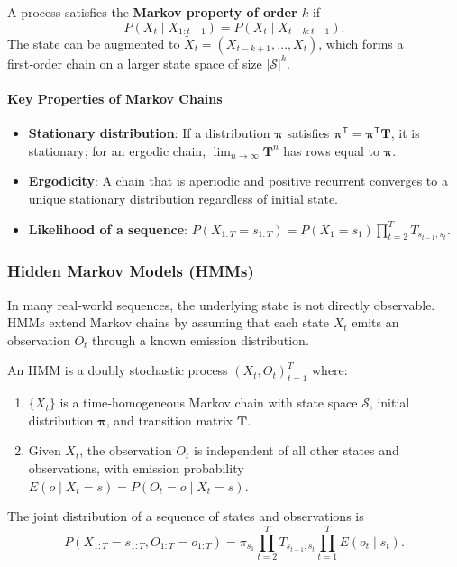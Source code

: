 \documentclass{tufte-handout}
\begin{document}
\begin{defn}
    A process satisfies the \textbf{Markov property of order $k$} if
    \[
    P(X_t \mid X_{1:t-1}) = P(X_t \mid X_{t-k:t-1}).
    \]
    The state can be augmented to $\tilde{X}_t = (X_{t-k+1}, \dots, X_t)$, which forms a first‑order chain on a larger state space of size $|\mathcal{S}|^k$.
\end{defn}

\paragraph{Key Properties of Markov Chains}

\begin{itemize}
    \item \textbf{Stationary distribution}: If a distribution $\boldsymbol{\pi}$ satisfies $\boldsymbol{\pi}^{\mathsf{T}} = \boldsymbol{\pi}^{\mathsf{T}} \mathbf{T}$, it is stationary; for an ergodic chain, $\lim_{n\to\infty} \mathbf{T}^n$ has rows equal to $\boldsymbol{\pi}$.
    \item \textbf{Ergodicity}: A chain that is aperiodic and positive recurrent converges to a unique stationary distribution regardless of initial state.
    \item \textbf{Likelihood of a sequence}: $P(X_{1:T}=s_{1:T}) = P(X_1=s_1) \prod_{t=2}^T T_{s_{t-1}, s_t}$.
\end{itemize}

\subsubsection{Hidden Markov Models (HMMs)}

In many real‑world sequences, the underlying state is not directly observable. HMMs extend Markov chains by assuming that each state $X_t$ emits an observation $O_t$ through a known emission distribution.

\begin{defn}
    An HMM is a doubly stochastic process $(X_t, O_t)_{t=1}^T$ where:
    \begin{enumerate}
        \item $\{X_t\}$ is a time‑homogeneous Markov chain with state space $\mathcal{S}$, initial distribution $\boldsymbol{\pi}$, and transition matrix $\mathbf{T}$.
        \item Given $X_t$, the observation $O_t$ is independent of all other states and observations, with emission probability $E(o \mid X_t=s) = P(O_t=o \mid X_t=s)$.
    \end{enumerate}
    The joint distribution of a sequence of states and observations is
    \[
    P(X_{1:T}=s_{1:T}, O_{1:T}=o_{1:T}) = \pi_{s_1} \prod_{t=2}^T T_{s_{t-1}, s_t} \prod_{t=1}^T E(o_t \mid s_t).
    \]
\end{defn}
\end{document}
